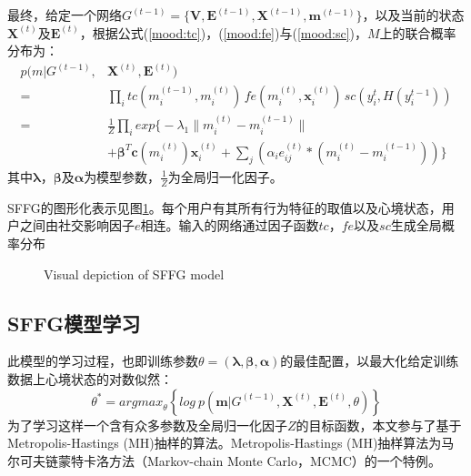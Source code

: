 最终，给定一个网络$G^{(t-1)} = \{\mathbf{V}, \textbf{E}^{(t-1)}, \mathbf{X}^{(t-1)}, \mathbf{m}^{(t-1)}\}$，以及当前的状态$\mathbf{X}^{(t)}$及$\mathbf{E}^{(t)}$，根据公式(\ref{mood:tc})，(\ref{mood:fe})与(\ref{mood:sc})，$M$上的联合概率分布为： 
\begin{equation}
\begin{split}
p(m|G^{(t-1)},& \mathbf{X}^{(t)}, \mathbf{E}^{(t)}) \\
=& \prod_i tc(m_i^{(t-1)}, m_i^{(t)})\,fe(m_i^{(t)}, \mathbf{x}_i^{(t)})\, sc(y_i^{t},H(y_i^{t-1})) \\
=& \frac{1}{Z} \prod_i exp \bigg\{-\lambda _1 \| m_i^{(t)} -m_i^{(t-1)} \|  \\
& + \mathbf{\beta}^T\mathbf{c}(m_i^{(t)}) \mathbf{x}_i^{(t)} + \sum_j \left(\alpha_i e_{ij}^{(t)} * (m_i^{(t)} -m_i^{(t-1)})\right) \bigg \}
\end{split}
\label{mood:target}
\end{equation}
其中$\mathbf{\lambda}$，$\mathbf{\beta}$及$\mathbf{\alpha}$为模型参数，$\frac{1}{Z}$为全局归一化因子。

SFFG的图形化表示见图\ref{mood:fig:sffg}。每个用户有其所有行为特征的取值以及心境状态，用户之间由社交影响因子$e$相连。输入的网络通过因子函数$tc$，$fe$以及$sc$生成全局概率分布

\begin{figure}[htbp]
  \centering
  \caption{Visual depiction of SFFG model}
  \label{mood:fig:sffg}
\end{figure}


\subsection{SFFG模型学习}
\label{mood:sec:ModelLearning}
此模型的学习过程，也即训练参数$\theta = (\mathbf{\lambda}, \mathbf{\beta}, \mathbf{\alpha})$的最佳配置，以最大化给定训练数据上心境状态的对数似然：
\begin{equation}
\theta^* = {argmax}_\theta\left\{log\ p(\mathbf{m}|G^{(t-1)}, \mathbf{X}^{(t)}, \mathbf{E}^{(t)}, \theta)\right\}
\end{equation}
为了学习这样一个含有众多参数及全局归一化因子$Z$的目标函数，本文参与了基于Metropolis-Hastings (MH)抽样的算法。Metropolis-Hastings (MH)抽样算法为马尔可夫链蒙特卡洛方法（Markov-chain Monte Carlo，MCMC）的一个特例\cite{mh}\cite{socialEmotion}。

